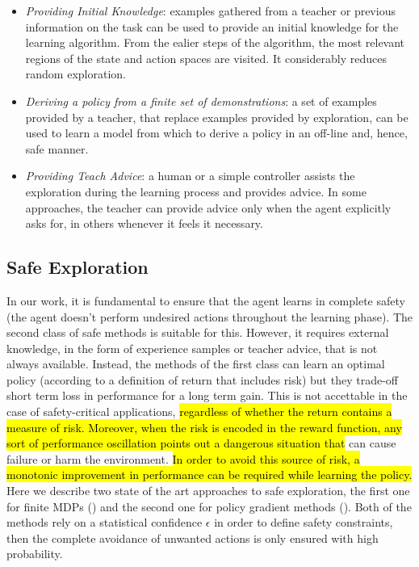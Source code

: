 \begin{itemize}
	\item \emph{Providing Initial Knowledge}: examples gathered from a teacher or previous information on the task can be used to provide an initial knowledge for the learning algorithm. From the ealier steps of the algorithm, the most relevant regions of the state and action spaces are visited. It considerably reduces random exploration.
	\item \emph{Deriving a policy from a finite set of demonstrations}: a set of examples provided by a teacher, that replace examples provided by exploration, can be used to learn a model from which to derive a policy in an off-line and, hence, safe manner.
	\item \emph{Providing Teach Advice}: a human or a simple controller assists the exploration during the learning process and provides advice. In some approaches, the teacher can provide advice only when the agent explicitly asks for, in others whenever it feels it necessary. 
\end{itemize}

\subsection{Safe Exploration}
In our work, it is fundamental to ensure that the agent learns in complete safety (\ie the agent doesn't perform undesired actions throughout the learning phase). The second class of safe methods is suitable for this. However, it requires external knowledge, in the form of experience samples or teacher advice, that is not always available. Instead, the methods of the first class can learn an optimal policy (according to a definition of return that includes risk) but they trade-off short term loss in performance for a long term gain. This is not accettable in the case of safety-critical applications, \hl{regardless of whether the return contains a measure of risk. Moreover, when the risk is encoded in the reward function, any sort of performance oscillation points out a dangerous situation that} can cause failure or harm the environment. \hl{In order to avoid this source of risk, a monotonic improvement in performance can be required while learning the policy.} Here we describe two state of the art approaches to safe exploration, the first one for finite \ac{MDPs} () and the second one for policy gradient methods (). Both of the methods rely on a statistical confidence $\epsilon$ in order to define safety constraints, then the complete avoidance of unwanted actions is only ensured with high probability. 

